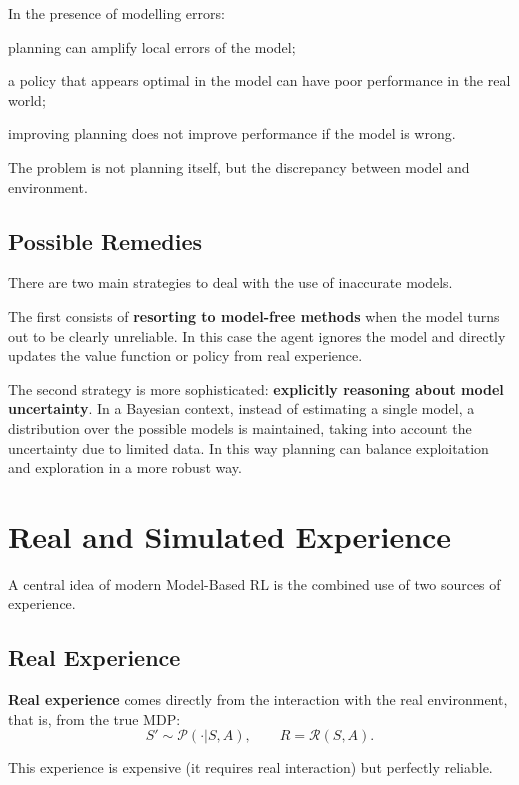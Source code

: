 In the presence of modelling errors:
\begin{compactitemize}
    \item planning can amplify local errors of the model;
    \item a policy that appears optimal in the model can have poor performance in the real world;
    \item improving planning does not improve performance if the model is wrong.
\end{compactitemize}

The problem is not planning itself, but the discrepancy between model and environment.

\subsection{Possible Remedies}

There are two main strategies to deal with the use of inaccurate models.

The first consists of \textbf{resorting to model-free methods} when the model turns out to be clearly unreliable.
In this case the agent ignores the model and directly updates the value function or policy from real experience.

The second strategy is more sophisticated: \textbf{explicitly reasoning about model uncertainty}.
In a Bayesian context, instead of estimating a single model, a distribution over the possible models is maintained,
taking into account the uncertainty due to limited data.
In this way planning can balance exploitation and exploration in a more robust way.

\section{Real and Simulated Experience}

A central idea of modern Model-Based RL is the combined use of two sources of experience.

\subsection{Real Experience}

\textbf{Real experience} comes directly from the interaction with the real environment,
that is, from the true MDP:
\[
S' \sim \mathcal{P}(\cdot | S, A),
\qquad
R = \mathcal{R}(S, A).
\]

This experience is expensive (it requires real interaction) but perfectly reliable.


